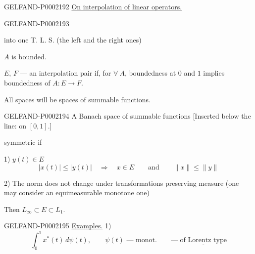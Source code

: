 \begin{GelfandAdjacentEvidence}{GELFAND-P000219}{2}
\underline{On interpolation of linear operators.}






\end{GelfandAdjacentEvidence}
\begin{GelfandAdjacentEvidence}{GELFAND-P000219}{3}

\end{GelfandAdjacentEvidence}
 into one T. L. S. (the left and the right ones)

$A$ is bounded.

$E$, $F$ — an interpolation pair if, for $\forall\ A$, boundedness
at $0$ and $1$ implies boundedness of $A: E\longrightarrow F$.



All spaces will be spaces of summable functions.



\begin{GelfandAdjacentEvidence}{GELFAND-P000219}{4}
A Banach space of summable functions [Inserted below the line: on $[0,1]$.]
\end{GelfandAdjacentEvidence}
 symmetric if

1) $y (t)\in E$
\begin{equation*}
 |x (t)|\leq |y (t)|\quad\Longrightarrow\quad x\in E
 \qquad\text{and}\qquad \|x\|\leq\|y\|
\end{equation*}



2) The norm does not change under transformations preserving measure
(one may consider an equimeasurable monotone one)



Then $L_\infty\subset E\subset L_1$.



\begin{GelfandAdjacentEvidence}{GELFAND-P000219}{5}
\underline{Examples.} 1)
\begin{equation*}
 \int_0^1 x^*(t)\, d\psi (t),\qquad \psi (t)\text{ — monot.}
 \qquad\text{— }\underline{\text{of Lorentz type}}
\end{equation*}
\end{GelfandAdjacentEvidence}

